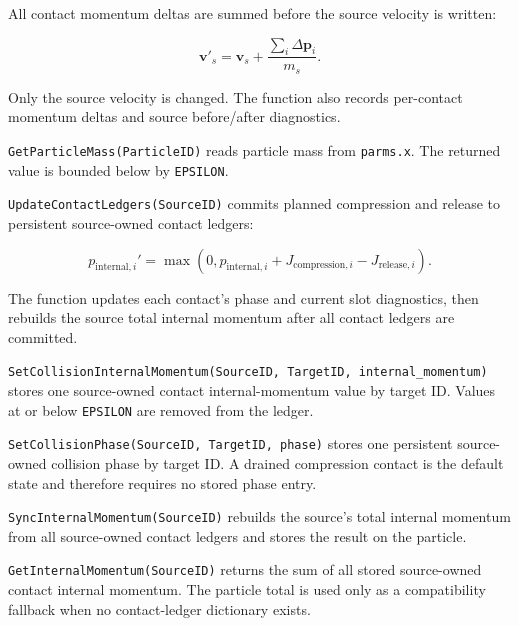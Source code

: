 All contact momentum deltas are summed before the source velocity is written:

\begin{equation}
\mathbf{v}'_s
=
\mathbf{v}_s+\frac{\sum_i\Delta\mathbf{p}_i}{m_s}.
\end{equation}

Only the source velocity is changed.  The function also records per-contact
momentum deltas and source before/after diagnostics.


\texttt{GetParticleMass(ParticleID)} reads particle mass from
\texttt{parms.x}.  The returned value is bounded below by \texttt{EPSILON}.


\texttt{UpdateContactLedgers(SourceID)} commits planned compression and release
to persistent source-owned contact ledgers:

\begin{equation}
p_{\mathrm{internal},i}'
=
\max(0,
p_{\mathrm{internal},i}
+ J_{\mathrm{compression},i}
- J_{\mathrm{release},i}).
\end{equation}

The function updates each contact's phase and current slot diagnostics, then
rebuilds the source total internal momentum after all contact ledgers are
committed.


\texttt{SetCollisionInternalMomentum(SourceID, TargetID, internal\_momentum)}
stores one source-owned contact internal-momentum value by target ID.  Values at
or below \texttt{EPSILON} are removed from the ledger.


\texttt{SetCollisionPhase(SourceID, TargetID, phase)} stores one persistent
source-owned collision phase by target ID.  A drained compression contact is
the default state and therefore requires no stored phase entry.


\texttt{SyncInternalMomentum(SourceID)} rebuilds the source's total internal
momentum from all source-owned contact ledgers and stores the result on the
particle.


\texttt{GetInternalMomentum(SourceID)} returns the sum of all stored
source-owned contact internal momentum.  The particle total is used only as a
compatibility fallback when no contact-ledger dictionary exists.


